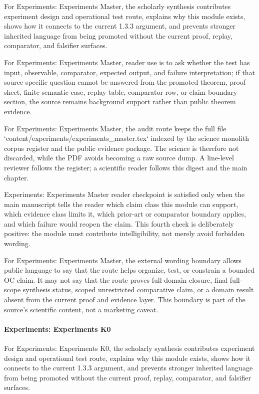 For Experiments: Experiments Master, the scholarly synthesis contributes experiment design and operational test route, explains why this module exists, shows how it connects to the current 1.3.3 argument, and prevents stronger inherited language from being promoted without the current proof, replay, comparator, and falsifier surfaces.


For Experiments: Experiments Master, reader use is to ask whether the test has input, observable, comparator, expected output, and failure interpretation; if that source-specific question cannot be answered from the promoted theorem, proof sheet, finite semantic case, replay table, comparator row, or claim-boundary section, the source remains background support rather than public theorem evidence.


For Experiments: Experiments Master, the audit route keeps the full file `content/experiments/experiments\_master.tex` indexed by the science monolith corpus register and the public evidence package. The science is therefore not discarded, while the PDF avoids becoming a raw source dump. A line-level reviewer follows the register; a scientific reader follows this digest and the main chapter.


Experiments: Experiments Master reader checkpoint is satisfied only when the main manuscript tells the reader which claim class this module can support, which evidence class limits it, which prior-art or comparator boundary applies, and which failure would reopen the claim. This fourth check is deliberately positive: the module must contribute intelligibility, not merely avoid forbidden wording.


For Experiments: Experiments Master, the external wording boundary allows public language to say that the route helps organize, test, or constrain a bounded OC claim. It may not say that the route proves full-domain closure, final full-scope synthesis status, scoped unrestricted comparative claim, or a domain result absent from the current proof and evidence layer. This boundary is part of the source's scientific content, not a marketing caveat.


\paragraph{Experiments: Experiments K0}

For Experiments: Experiments K0, the scholarly synthesis contributes experiment design and operational test route, explains why this module exists, shows how it connects to the current 1.3.3 argument, and prevents stronger inherited language from being promoted without the current proof, replay, comparator, and falsifier surfaces.



